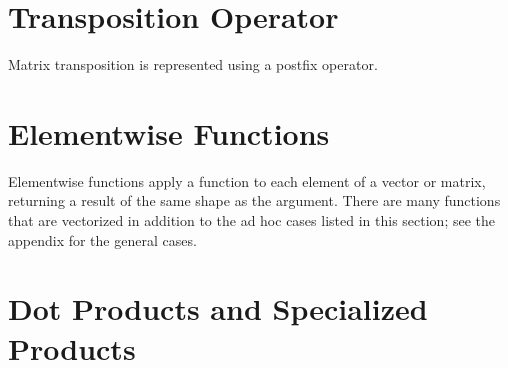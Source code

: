 \begin{description}
\begin{description}
\begin{description}
\begin{description}
\begin{description}
\begin{description}
\begin{description}
\begin{description}
\begin{description}
\begin{description}
\begin{description}
\begin{description}
\begin{description}
\begin{description}
\begin{description}
\begin{description}
\begin{description}
\begin{description}
\begin{description}
\begin{description}
\begin{description}
\begin{description}
\begin{description}
\begin{description}
\begin{description}
\begin{description}
\begin{description}
\begin{description}
\begin{description}
\begin{description}
\begin{description}
\begin{description}
\begin{description}
\begin{description}
\begin{description}
\begin{description}
\begin{description}
\begin{description}
\begin{description}
\begin{description}
\begin{description}
\begin{description}
\section{Transposition Operator}

Matrix transposition is represented using a postfix operator.

\begin{description} %



\section{Elementwise Functions}

Elementwise functions apply a function to each element of a vector or matrix, returning a result of the same shape as the argument.  There are many functions that are vectorized in addition to the ad hoc cases listed in this section;  see the appendix for the general cases.



\section{Dot Products and Specialized Products}


\end{description}
\end{description}
\end{description}
\end{description}
\end{description}
\end{description}
\end{description}
\end{description}
\end{description}
\end{description}
\end{description}
\end{description}
\end{description}
\end{description}
\end{description}
\end{description}
\end{description}
\end{description}
\end{description}
\end{description}
\end{description}
\end{description}
\end{description}
\end{description}
\end{description}
\end{description}
\end{description}
\end{description}
\end{description}
\end{description}
\end{description}
\end{description}
\end{description}
\end{description}
\end{description}
\end{description}
\end{description}
\end{description}
\end{description}
\end{description}
\end{description}
\end{description}
\end{description}
